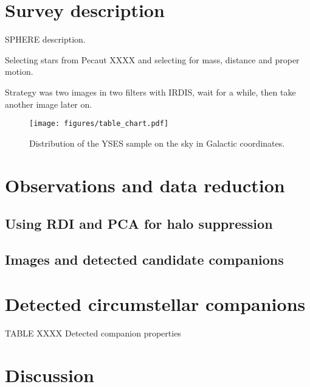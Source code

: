 \documentclass[onecolumn]{aa} %
\begin{document}
\section{Survey description}\label{sec:sample}

SPHERE description.

Selecting stars from Pecaut XXXX and selecting for mass, distance and proper motion.

Strategy was two images in two filters with IRDIS, wait for a while, then take another image later on.


\begin{figure}
   \begin{centering}
   \texttt{[image: figures/table\_chart.pdf]}
      \caption{Distribution of the YSES sample on the sky in Galactic coordinates.}
      \label{fig:tablechart}
      \end{centering}
\end{figure}



\lipsum[2-4]

\section{Observations and data reduction}\label{sec:obs}
\lipsum[2-4]



\subsection{Using RDI and PCA for halo suppression}
\lipsum[2-4]

\subsection{Images and detected candidate companions}
\lipsum[2-4]

\section{Detected circumstellar companions}\label{sec:companions}
\lipsum[2-4]

TABLE XXXX Detected companion properties

\lipsum[2-8]

\section{Discussion}\label{sec:discuss}
\lipsum[2-8]
\end{document}
